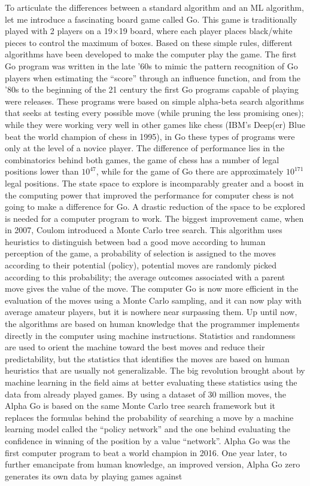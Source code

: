 \documentclass[main]{subfiles}
\begin{document}
To articulate the differences between a standard algorithm and an ML algorithm, let me introduce a fascinating board game called Go. This game is traditionally played with 2 players on a 19$\times$19 board, where each player places black/white pieces to control the maximum of boxes. Based on these simple rules, different algorithms have been developed to make the computer play the game. The first Go program was written in the late ’60s to mimic the pattern recognition of Go players when estimating the ``score'' through an influence function,\autocite{zobrist1970feature} and from the ’80s to the beginning of the 21 century the first Go programs capable of playing were releases. These programs were based on simple alpha-beta search algorithms that seeks at testing every possible move (while pruning the less promising ones); while they were working very well in other games like chess (IBM's Deep(er) Blue beat the world champion of chess in 1995), in Go these types of programs were only at the level of a novice player. The difference of performance lies in the combinatorics behind both games, the game of chess has a number of legal positions lower than $10^{47}$,\autocite{website_labelle} while for the game of Go there are approximately $10^{171}$ legal positions.\autocite{Tromp_2007,github_tromp_go} The state space to explore is incomparably greater and a boost in the computing power that improved the performance for computer chess is not going to make a difference for Go. A drastic reduction of the space to be explored is needed for a computer program to work. The biggest improvement came, when in 2007, Coulom introduced a Monte Carlo tree search.\autocite{Coulom_2007} This algorithm uses heuristics to distinguish between bad a good move according to human perception of the game, a probability of selection is assigned to the moves according to their potential (policy), potential moves are randomly picked according to this probability; the average outcomes associated with a parent move gives the value of the move. The computer Go is now more efficient in the evaluation of the moves using a Monte Carlo sampling, and it can now play with average amateur players, but it is nowhere near surpassing them. Up until now, the algorithms are based on human knowledge that the programmer implements directly in the computer using machine instructions. Statistics and randomness are used to orient the machine toward the best moves and reduce their predictability, but the statistics that identifies the moves are based on human heuristics that are usually not generalizable. The big revolution brought about by machine learning in the field aims at better evaluating these statistics using the data from already played games. By using a dataset of 30 million moves, the Alpha Go is based on the same Monte Carlo tree search framework but it replaces the formulas behind the probability of searching a move by a machine learning model called the ``policy network'' and the one behind evaluating the confidence in winning of the position by a value ``network''.\autocite{Silver_2016} Alpha Go was the first computer program to beat a world champion in 2016. One year later, to further emancipate from human knowledge, an improved version, Alpha Go zero generates its own data by playing games against 
\end{document}
